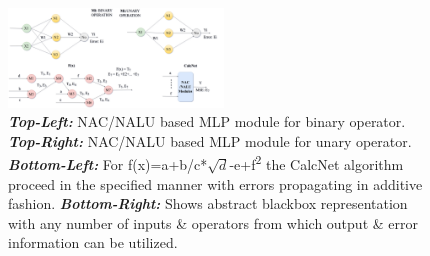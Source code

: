 \documentclass[conference]{IEEEtran}
\begin{document}
\begin{figure}[!h]
\centering
\includegraphics[width=0.51\textwidth]{_assets/CalcNet.png}
\caption{\textbf{\textit{Top-Left: }}NAC/NALU based MLP module for binary operator.
\textbf{\textit{Top-Right: }}NAC/NALU based MLP module for unary operator. 
\textbf{\textit{Bottom-Left: }} For f(x)=a+b/c*$\sqrt{d}$-e+f\textsuperscript{2} the CalcNet algorithm  proceed in the specified manner with errors propagating in additive fashion. 
\textbf{\textit{Bottom-Right: }} Shows abstract blackbox representation with any number of inputs \& operators from which output \& error information can be utilized. 
 }
\label{fig3}
\end{figure}
\end{document}
